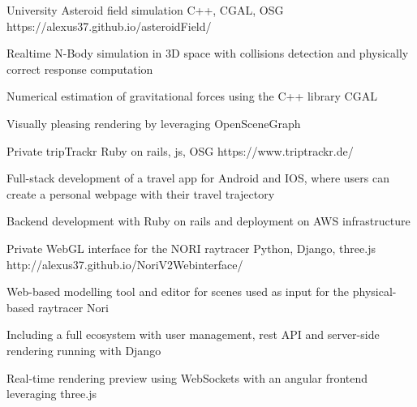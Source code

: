 

\begin{cventries}

  \cventry
    {University}
    {Asteroid field simulation} %
    {C++, CGAL, OSG} %
    {https://alexus37.github.io/asteroidField/} %
    {
      \begin{cvitems} %
        \item Realtime N-Body simulation in 3D space with collisions detection and physically correct response computation
        \item Numerical estimation of gravitational forces using the C++ library CGAL
        \item Visually pleasing rendering by leveraging OpenSceneGraph
      \end{cvitems}
    }

  \cventry
    {Private}
    {tripTrackr} %
    {Ruby on rails, js, OSG} %
    {https://www.triptrackr.de/} %
    {
      \begin{cvitems} %
        \item Full-stack development of a travel app for Android and IOS, where users can create a personal webpage with their travel trajectory
        \item Backend development with Ruby on rails and deployment on AWS infrastructure
      \end{cvitems}
    }

  \cventry
    {Private}
    {WebGL interface for the NORI raytracer} %
    {Python, Django, three.js} %
    {http://alexus37.github.io/NoriV2Webinterface/} %
    {
      \begin{cvitems} %
        \item Web-based modelling tool and editor for scenes used as input for the physical-based raytracer Nori
        \item Including a full ecosystem with user management, rest API and server-side rendering running with Django
        \item Real-time rendering preview using WebSockets with an angular frontend leveraging three.js
      \end{cvitems}
    }


\end{cventries}
